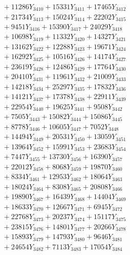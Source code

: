 \documentclass[a4paper,10pt]{article}
\begin{document}
{\begin{align}
&\;  + 11286 Y_{3410} + 15331 Y_{3411} + 17465 Y_{3412} \\[0.3ex]
&\;  + 21734 Y_{3413} + 15024 Y_{3414} + 22202 Y_{3415} \\[0.3ex]
&\;  + 9451 Y_{3416} + 15390 Y_{3417} + 24029 Y_{3418} \\[0.5ex]\allowbreak
&\;  + 10698 Y_{3419} + 11332 Y_{3420} + 14327 Y_{3421} \\[0.3ex]
&\;  + 13162 Y_{3422} + 12288 Y_{3423} + 19671 Y_{3424} \\[0.3ex]
&\;  + 16292 Y_{3425} + 10516 Y_{3426} + 14174 Y_{3427} \\[0.3ex]
&\;  + 23619 Y_{3428} + 12486 Y_{3429} + 17764 Y_{3430} \\[0.3ex]
&\;  + 20410 Y_{3431} + 11961 Y_{3432} + 21009 Y_{3433} \\[0.3ex]
&\;  + 14218 Y_{3434} + 25297 Y_{3435} + 17832 Y_{3436} \\[0.3ex]
&\;  + 14121 Y_{3437} + 17378 Y_{3438} + 22911 Y_{3439} \\[0.3ex]
&\;  + 22954 Y_{3440} + 19625 Y_{3441} + 9508 Y_{3442} \\[0.3ex]
&\;  + 7505 Y_{3443} + 15082 Y_{3444} + 15086 Y_{3445} \\[0.3ex]
&\;  + 8778 Y_{3446} + 10605 Y_{3447} + 7052 Y_{3448} \\[0.5ex]\allowbreak
&\;  + 14494 Y_{3449} + 20531 Y_{3450} + 13059 Y_{3451} \\[0.3ex]
&\;  + 13964 Y_{3452} + 15991 Y_{3453} + 23683 Y_{3454} \\[0.3ex]
&\;  + 7447 Y_{3455} + 13730 Y_{3456} + 16390 Y_{3457} \\[0.3ex]
&\;  + 22012 Y_{3458} + 8068 Y_{3459} + 19870 Y_{3460} \\[0.3ex]
&\;  + 8334 Y_{3461} + 12953 Y_{3462} + 18064 Y_{3463} \\[0.3ex]
&\;  + 18024 Y_{3464} + 8308 Y_{3465} + 20808 Y_{3466} \\[0.3ex]
&\;  + 19890 Y_{3467} + 16439 Y_{3468} + 14404 Y_{3469} \\[0.3ex]
&\;  + 18633 Y_{3470} + 12667 Y_{3471} + 6945 Y_{3472} \\[0.3ex]
&\;  + 22768 Y_{3473} + 20237 Y_{3474} + 15117 Y_{3475} \\[0.3ex]
&\;  + 23815 Y_{3476} + 14801 Y_{3477} + 20266 Y_{3478} \\[0.5ex]\allowbreak
&\;  + 15893 Y_{3479} + 14793 Y_{3480} + 9646 Y_{3481} \\[0.3ex]
&\;  + 24654 Y_{3482} + 7113 Y_{3483} + 17054 Y_{3484} \\[0.3ex]

\end{align}}
\end{document}
